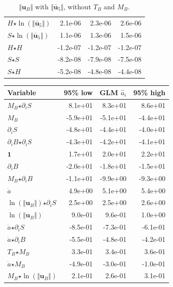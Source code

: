 \begin{table}[H]
\begin{tabular}{l|r|r|r}
  $H$$ \star $$\ln\left( \Vert \bar{\mathbf{u}}_{5} \Vert \right)$ & 2.1e-06 & 2.3e-06 & 2.6e-06 \\
  $S$$ \star $$\ln\left( \Vert \bar{\mathbf{u}}_{5} \Vert \right)$ & 1.1e-06 & 1.3e-06 & 1.5e-06 \\
  $H$$ \star $$H$ & -1.2e-07 & -1.2e-07 & -1.2e-07 \\
  $S$$ \star $$S$ & -8.2e-08 & -7.9e-08 & -7.5e-08 \\
  $S$$ \star $$H$ & -5.2e-08 & -4.8e-08 & -4.4e-08 \\
\end{tabular}
  \caption[]{$\Vert \mathbf{u}_B \Vert$ with $\Vert \mathbf{\bar{u}}_5 \Vert$, without $T_B$ and $M_B$.}
\end{table}

\begin{table}[H]
\centering
\begin{tabular}{l|r|r|r}
  \textbf{Variable} & \textbf{95\% low} & \textbf{GLM} $\hat{a}_i$ & \textbf{95\% high} \\
  \hline
  $M_B$$ \star $$\partial_i S$ & 8.1e+01 & 8.3e+01 & 8.6e+01 \\
  $M_B$ & -5.9e+01 & -5.1e+01 & -4.4e+01 \\
  $\partial_i S$ & -4.8e+01 & -4.4e+01 & -4.0e+01 \\
  $\partial_i B$$ \star $$\partial_i S$ & -4.3e+01 & -4.2e+01 & -4.1e+01 \\
  $\mathbf{1}$ & 1.7e+01 & 2.0e+01 & 2.2e+01 \\
  $\partial_i B$ & -2.0e+01 & -1.8e+01 & -1.5e+01 \\
  $M_B$$ \star $$\partial_i B$ & -1.1e+01 & -9.9e+00 & -9.3e+00 \\
  $\dot{a}$ & 4.9e+00 & 5.1e+00 & 5.4e+00 \\
  $\ln\left( \Vert \mathbf{u}_B \Vert \right)$$ \star $$\partial_i S$ & 2.5e+00 & 2.5e+00 & 2.6e+00 \\
  $\ln\left( \Vert \mathbf{u}_B \Vert \right)$ & 9.0e-01 & 9.6e-01 & 1.0e+00 \\
  $\dot{a}$$ \star $$\partial_i S$ & -8.5e-01 & -7.3e-01 & -6.1e-01 \\
  $\dot{a}$$ \star $$\partial_i B$ & -5.5e-01 & -4.8e-01 & -4.2e-01 \\
  $T_B$$ \star $$M_B$ & 3.3e-01 & 3.4e-01 & 3.6e-01 \\
  $\dot{a}$$ \star $$M_B$ & -4.9e-01 & -3.0e-01 & -1.0e-01 \\
  $M_B$$ \star $$\ln\left( \Vert \mathbf{u}_B \Vert \right)$ & 2.1e-01 & 2.6e-01 & 3.1e-01 \\

\end{tabular}
\end{table}
